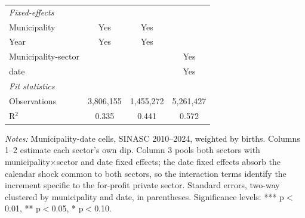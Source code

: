 \begin{table}[H]
{\begin{tabular}{lccc}
      \emph{Fixed-effects}\\
      Municipality                       & Yes               & Yes                & \\  
      Year                               & Yes               & Yes                & \\  
      Municipality-sector                &                   &                    & Yes\\  
      date                               &                   &                    & Yes\\  
      \midrule
      \emph{Fit statistics}\\
      Observations                       & 3,806,155         & 1,455,272          & 5,261,427\\  
      R$^2$                              & 0.335             & 0.441              & 0.572\\  
\bottomrule
   \end{tabular}
}
   
   \par \raggedright 
   \footnotesize\textit{Notes:} Municipality-date cells, SINASC 2010--2024, weighted by births. Columns 1--2 estimate each sector's own dip. Column 3 pools both sectors with municipality$\times$sector and date fixed effects; the date fixed effects absorb the calendar shock common to both sectors, so the interaction terms identify the increment specific to the for-profit private sector. Standard errors, two-way clustered by municipality and date, in parentheses. \footnotesize Significance levels: *** p$<$0.01, ** p$<$0.05, * p$<$0.10.
\end{table}


